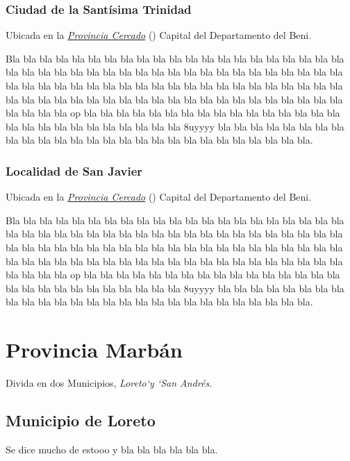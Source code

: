 \documentclass[letterpaper,10pt,english]{sphinxmanual}
\begin{document}
\subsection{Ciudad de la Santísima Trinidad}
\label{cercado:ciudad-de-la-santisima-trinidad}\label{cercado:trinidad}
Ubicada en la {\hyperref[cercado:cercado]{\emph{Provincia Cercado}}} () Capital del Departamento del Beni.

Bla bla bla bla bla bla bla bla bla bla bla bla bla bla bla bla bla bla bla bla bla bla bla bla bla bla bla bla bla bla bla bla bla bla
bla bla bla bla bla bla bla bla bla bla bla bla bla bla bla bla bla bla bla bla bla bla bla bla bla bla bla
bla bla bla bla bla bla bla bla bla bla bla bla bla bla bla bla bla bla bla bla bla bla bla bla bla bla bla op
bla bla bla bla bla bla bla bla bla bla bla bla bla bla bla bla bla bla bla bla bla bla bla bla bla bla bla 8uyyyy
bla bla bla bla bla bla bla bla bla bla bla bla bla bla bla bla bla bla bla bla bla bla bla bla bla bla bla.


\subsection{Localidad de San Javier}
\label{cercado:san-javier}\label{cercado:localidad-de-san-javier}
Ubicada en la {\hyperref[cercado:cercado]{\emph{Provincia Cercado}}} () Capital del Departamento del Beni.

Bla bla bla bla bla bla bla bla bla bla bla bla bla bla bla bla bla bla bla bla bla bla bla bla bla bla bla bla bla bla bla bla bla bla
bla bla bla bla bla bla bla bla bla bla bla bla bla bla bla bla bla bla bla bla bla bla bla bla bla bla bla
bla bla bla bla bla bla bla bla bla bla bla bla bla bla bla bla bla bla bla bla bla bla bla bla bla bla bla op
bla bla bla bla bla bla bla bla bla bla bla bla bla bla bla bla bla bla bla bla bla bla bla bla bla bla bla 8uyyyy
bla bla bla bla bla bla bla bla bla bla bla bla bla bla bla bla bla bla bla bla bla bla bla bla bla bla bla.


\chapter{Provincia Marbán}
\label{marban:provincia-marban}\label{marban::doc}\label{marban:marban}
Divida en dos Municipios, \emph{Loreto{}`y {}`San Andrés}.


\section{Municipio de Loreto}
\label{marban:municipio-de-loreto}\label{marban:mun-loreto}
Se dice mucho de estooo  y bla bla bla bla bla bla.
\end{document}
